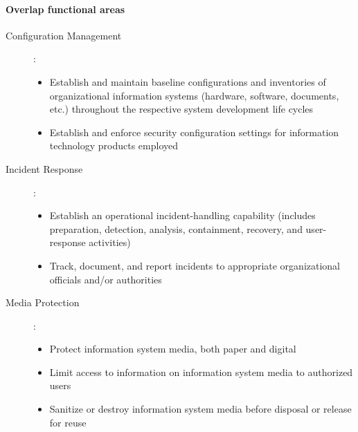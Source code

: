 \documentclass{article}
\begin{document}
            \paragraph{Overlap functional areas}
                        \begin{description}
                            \item[Configuration Management]: 
                            \begin{itemize}
                                \item Establish and maintain baseline configurations and inventories of organizational information systems (hardware, software, documents, etc.) throughout the respective system development life cycles
                                \item Establish and enforce security configuration settings for information technology products employed
                            \end{itemize}
                            \item [Incident Response]: 
                            \begin{itemize}
                                \item Establish an operational incident-handling capability (includes preparation, detection, analysis, containment, recovery, and user-response activities)
                                \item Track, document, and report incidents to appropriate organizational officials and/or authorities
                            \end{itemize}
                            \item [Media Protection]: 
                            \begin{itemize}
                                \item Protect information system media, both paper and digital
                                \item Limit access to information on information system media to authorized users
                                \item Sanitize or destroy information system media before disposal or release for reuse
                            \end{itemize}
                            
                        \end{description}
\end{document}

